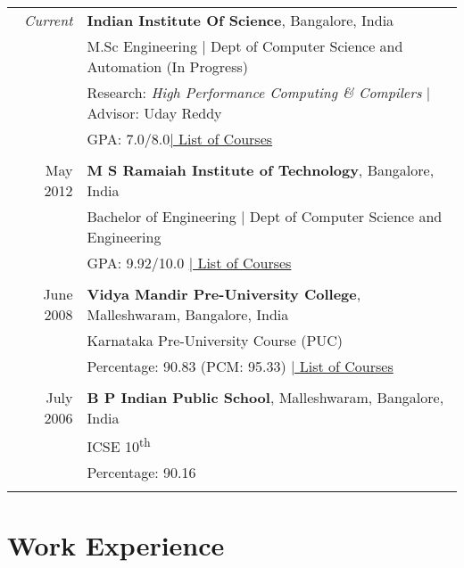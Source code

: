 \documentclass[a4paper,10pt]{article} %
\begin{document}
\begin{tabular}{rl}	
\emph{Current} & \textbf{Indian Institute Of Science}, Bangalore, India\\
& M.Sc Engineering | Dept of Computer Science and Automation (In Progress)\\
& Research: \small\emph{High Performance Computing \& Compilers} | Advisor: Uday Reddy\\
&\normalsize GPA: 7.0/8.0\hyperlink{iisc}{\hfill | \footnotesize List of Courses}\\
&\\


May 2012 & \textbf{M S Ramaiah Institute of Technology}, Bangalore, India\\
& Bachelor of Engineering | Dept of Computer Science and Engineering \\
&\normalsize GPA: 9.92/10.0 \hyperlink{msrit}{\hfill| \footnotesize List of Courses}\\
&\\


June 2008 & \textbf{Vidya Mandir Pre-University College}, Malleshwaram, Bangalore, India\\
& Karnataka Pre-University Course (PUC) \\
&\normalsize Percentage: 90.83 (PCM: 95.33) \hyperlink{hs}{\hfill| \footnotesize List of Courses}\\
&\\


July 2006 & \textbf{B P Indian Public School}, Malleshwaram, Bangalore, India\\
& ICSE 10\textsuperscript{th} \\
&\normalsize Percentage: 90.16 \\
&\\
\end{tabular}


\section{Work Experience}
\end{document}
